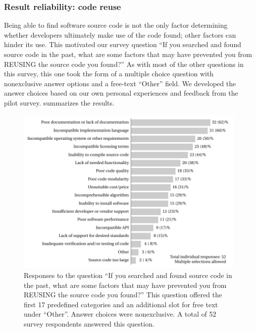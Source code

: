 \documentclass{casicswhitepaper}
\begin{document}
\subsubsection{Result reliability: code reuse}

Being able to find software source code is not the only factor determining whether developers ultimately make use of the code found; other factors can hinder its use.  This motivated our survey question ``If you searched and found source code in the past, what are some factors that may have prevented you from REUSING the source code you found?''  As with most of the other questions in this survey, this one took the form of a multiple choice question with nonexclusive answer options and a free-text ``Other'' field.  We developed the answer choices based on our own personal experiences and feedback from the pilot survey.   summarizes the results.

\begin{figure}[thb]
  \centering
  \includegraphics[width=5.65in]{files/plots/hindrance-to-reusing-src.pdf}
  \vspace*{-1.5ex}
  \caption{Responses to the question ``If you searched and found source code in the past, what are some factors that may have prevented you from REUSING the source code you found?''  This question offered the first 17 predefined categories and an additional slot for free text under ``Other''.  Answer choices were nonexclusive.  A total of 52 survey respondents answered this question.}
  \label{hindrance-to-reusing-src}
\end{figure}
\end{document}
